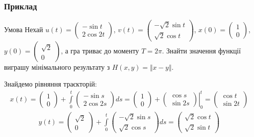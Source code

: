 \documentclass[10pt,pdf]{beamer}
\renewcommand{\l}{\left}
\renewcommand{\r}{\right}
\newcommand{\norm}[1]{\left\Vert #1 \right\Vert}
\newcommand{\intl}{\int\limits}
\begin{document}
    \begin{frame}
        \frametitle{Приклад}
        \begin{block}{Умова}
            Нехай $u(t) = \begin{pmatrix} -\sin t \\ 2 \cos {2t}\end{pmatrix}$, 
            $v(t) = \begin{pmatrix} -\sqrt{2}\sin t \\ \sqrt{2}\cos t \end{pmatrix}$,
            $x(0) = \begin{pmatrix} 1 \\ 0 \end{pmatrix}$, 
            $y(0) = \begin{pmatrix} \sqrt{2} \\ 0 \end{pmatrix}$, 
            а гра триває до моменту $T = 2\pi$.
            Знайти значення функції виграшу мінімального результату з $H(x, y) = \norm{x - y}$.    
        \end{block}
        Знайдемо рівняння траєкторій:
        \begin{gather*}
            x(t) = \begin{pmatrix} 1 \\ 0 \end{pmatrix} +
            \intl_0^t \begin{pmatrix} -\sin s \\ 2 \cos {2s} \end{pmatrix} ds = 
            \begin{pmatrix} 1 \\ 0 \end{pmatrix} +
            \l.\begin{pmatrix} \cos s \\ \sin{2s} \end{pmatrix}\r|_0^t = 
            \begin{pmatrix} \cos t \\ \sin{2t} \end{pmatrix}
        \end{gather*}
        \begin{gather*}
            y(t) = \begin{pmatrix} \sqrt{2} \\ 0 \end{pmatrix} +
            \intl_0^t \begin{pmatrix} -\sqrt{2}\sin s \\ \sqrt{2}\cos s  \end{pmatrix} ds = 
            \begin{pmatrix} \sqrt{2}\cos t \\ \sqrt{2}\sin t \end{pmatrix}
        \end{gather*}
    \end{frame}
\end{document}
